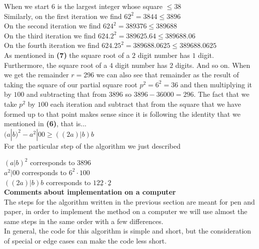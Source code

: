 \documentclass{uofa_template}
\begin{document}
\begin{enumerate}
When we start $6$ is the largest integer whose square $\leq 38$ \\
Similarly, on the first iteration we find $62^2 = 3844 \leq 3896$ \\
On the second iteration we find $624^2 = 389376 \leq 389688$ \\
On the third iteration we find $624.2^2 = 389625.64 \leq 389688.06$ \\
On the fourth iteration we find $624.25^2 = 389688.0625 \leq 389688.0625$ \\
 
As mentioned in \textbf{(7)} the square root of a $2$ digit number has $1$ digit. Furthermore, the square root of a $4$ digit number has $2$ digits. And so on. When we get the remainder $r = 296$ we can also see that remainder as the result of taking the square of our partial square root $p^2 = 6^2 = 36$ and then multiplying it by $100$ and subtracting that from $3896$ so $3896 - 36000 = 296$. The fact that we take $p^2$ by $100$ each iteration and subtract that from the square that we have formed up to that point makes sense since it is following the identity that we mentioned in \textbf{(6)}, that is... \\

 $(a|b)^2 - a^2|00 \geq ((2a)|b)b$ \\

 For the particular step of the algorithm we just described 

$(a|b)^2$ corresponds to $3896$ \\
$a^2|00$ corresponds to $6^2 \cdot 100$ \\
$((2a)|b)b$ corresponds to $12\underline{2} \cdot \underline{2}$ \\

\textbf{Comments about implementation on a computer} \\

The steps for the algorithm written in the previous section are meant for pen and paper, in order to implement the method on a computer we will use almost the same steps in the same order with a few differences. \\

In general, the code for this algorithm is simple and short, but the consideration of special or edge cases can make the code less short. \\


\end{enumerate}
\end{document}
